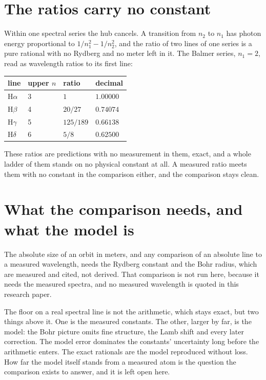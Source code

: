 \section{The ratios carry no constant}

Within one spectral series the hub cancels. A transition from $n_2$ to $n_1$ has photon energy
proportional to $1/n_1^2 - 1/n_2^2$, and the ratio of two lines of one series is a pure rational with
no Rydberg and no meter left in it. The Balmer series, $n_1 = 2$, read as wavelength ratios to its
first line:

\begin{center}
\begin{tabular}{@{}llll@{}}
\toprule
line & upper $n$ & ratio & decimal \\
\midrule
H$\alpha$ & 3 & $1$      & $1.00000$ \\
H$\beta$  & 4 & $20/27$  & $0.74074$ \\
H$\gamma$ & 5 & $125/189$& $0.66138$ \\
H$\delta$ & 6 & $5/8$    & $0.62500$ \\
\bottomrule
\end{tabular}
\end{center}

\noindent These ratios are predictions with no measurement in them, exact, and a whole ladder of them
stands on no physical constant at all. A measured ratio meets them with no constant in the comparison
either, and the comparison stays clean.

\section{What the comparison needs, and what the model is}

The absolute size of an orbit in meters, and any comparison of an absolute line to a measured
wavelength, needs the Rydberg constant and the Bohr radius, which are measured and cited, not derived.
That comparison is not run here, because it needs the measured spectra, and no measured wavelength is
quoted in this research paper.

The floor on a real spectral line is not the arithmetic, which stays exact, but two things above it.
One is the measured constants. The other, larger by far, is the model: the Bohr picture omits fine
structure, the Lamb shift and every later correction. The model error dominates the constants'
uncertainty long before the arithmetic enters. The exact rationals are the model reproduced without
loss. How far the model itself stands from a measured atom is the question the comparison exists to
answer, and it is left open here.
